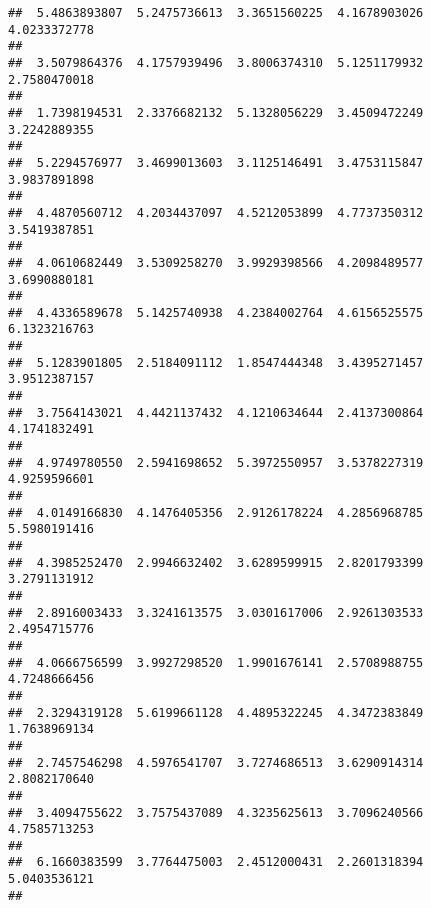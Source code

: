 \documentclass[]{article}
\begin{document}
\begin{verbatim}
##  5.4863893807  5.2475736613  3.3651560225  4.1678903026  4.0233372778 
##                                                                       
##  3.5079864376  4.1757939496  3.8006374310  5.1251179932  2.7580470018 
##                                                                       
##  1.7398194531  2.3376682132  5.1328056229  3.4509472249  3.2242889355 
##                                                                       
##  5.2294576977  3.4699013603  3.1125146491  3.4753115847  3.9837891898 
##                                                                       
##  4.4870560712  4.2034437097  4.5212053899  4.7737350312  3.5419387851 
##                                                                       
##  4.0610682449  3.5309258270  3.9929398566  4.2098489577  3.6990880181 
##                                                                       
##  4.4336589678  5.1425740938  4.2384002764  4.6156525575  6.1323216763 
##                                                                       
##  5.1283901805  2.5184091112  1.8547444348  3.4395271457  3.9512387157 
##                                                                       
##  3.7564143021  4.4421137432  4.1210634644  2.4137300864  4.1741832491 
##                                                                       
##  4.9749780550  2.5941698652  5.3972550957  3.5378227319  4.9259596601 
##                                                                       
##  4.0149166830  4.1476405356  2.9126178224  4.2856968785  5.5980191416 
##                                                                       
##  4.3985252470  2.9946632402  3.6289599915  2.8201793399  3.2791131912 
##                                                                       
##  2.8916003433  3.3241613575  3.0301617006  2.9261303533  2.4954715776 
##                                                                       
##  4.0666756599  3.9927298520  1.9901676141  2.5708988755  4.7248666456 
##                                                                       
##  2.3294319128  5.6199661128  4.4895322245  4.3472383849  1.7638969134 
##                                                                       
##  2.7457546298  4.5976541707  3.7274686513  3.6290914314  2.8082170640 
##                                                                       
##  3.4094755622  3.7575437089  4.3235625613  3.7096240566  4.7585713253 
##                                                                       
##  6.1660383599  3.7764475003  2.4512000431  2.2601318394  5.0403536121 
##                                                                       

\end{verbatim}
\end{document}
